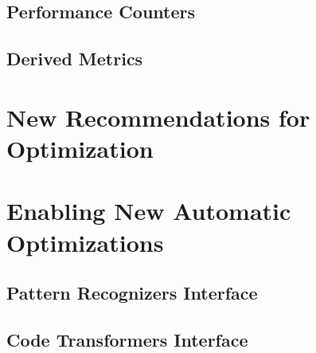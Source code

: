 \subsection{Performance Counters}

\subsection{Derived Metrics}

\section{New Recommendations for Optimization}

\section{Enabling New Automatic Optimizations}

\subsection{Pattern Recognizers Interface}

\subsection{Code Transformers Interface}
